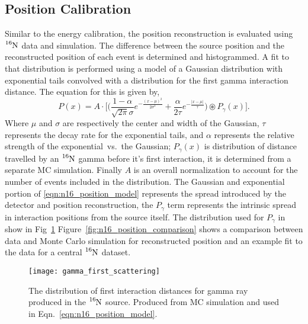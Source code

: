 \subsection{Position Calibration}
Similar to the energy calibration, the position reconstruction is evaluated
using $\ce{^{16}N}$ data and simulation.
The difference between the source position and the reconstructed
position of each event is determined and histogrammed.
A fit to that distribution is performed using a model of a Gaussian distribution
with exponential tails convolved with a distribution for the first gamma interaction
distance. The equation for this is given by,
\begin{equation}
    P(x)  = A \cdot \bigg[ \bigg(\frac{1 - \alpha}{\sqrt{2\pi}\sigma}e^{- \frac{(x-\mu)^2}{2\sigma^2}} + \frac{\alpha }{2 \tau}e^{-\frac{|x-\mu|}{\tau}}\bigg) \circledast P_{\gamma}(x) \bigg]\text{.}
    \label{eqn:n16_position_model}
\end{equation}
Where $\mu$ and $\sigma$ are respectively the center and width of the Gaussian,
$\tau$ represents the decay rate for the exponential tails, and $\alpha$ represents
the relative strength of the exponential~vs.~the Gaussian;
$P_{\gamma}(x)$ is distribution of distance travelled by an $\ce{^{16}N}$
gamma before it's first interaction, it is determined from a separate MC
simulation.
Finally $A$ is an overall normalization to account for the number of events
included in the distribution.
The Gaussian and exponential portion of
\eqref{eqn:n16_position_model} represents the spread introduced by the detector
and position reconstruction, the $P_\gamma$ term represents the intrinsic spread
in interaction positions from the source itself.
The distribution used for $P_\gamma$ in show in Fig~\ref{fig:gamma_first}
Figure~\ref{fig:n16_position_comparison} shows a comparison between data
and Monte Carlo simulation for reconstructed position and an example fit to the data
for a central $\ce{^{16}N}$ dataset.
\begin{figure}[htbp]
    \centering
    \texttt{[image: gamma\_first\_scattering]}
    \caption[Distribution of Gamma First Interaction Distance]{
    The distribution of first interaction distances for gamma ray produced
    in the $\ce{^{16}N}$ source. Produced from MC simulation and used in
    Eqn.~\eqref{eqn:n16_position_model}.}
    \label{fig:gamma_first}
\end{figure}


